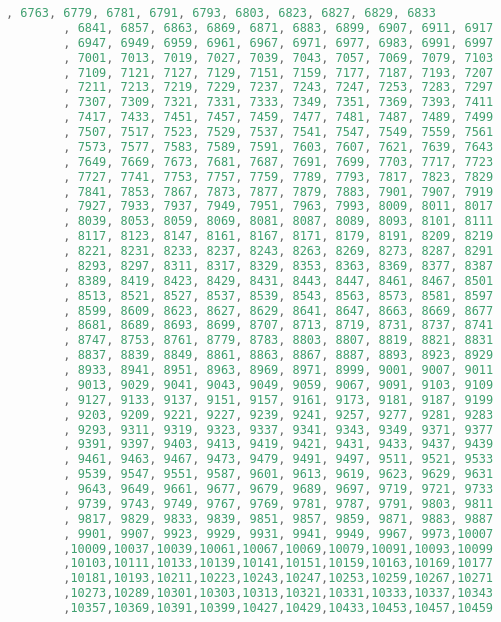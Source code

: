 \begin{solution}
\begin{lstlisting}[language=Java, caption="Java"]
		, 6763, 6779, 6781, 6791, 6793, 6803, 6823, 6827, 6829, 6833 
		, 6841, 6857, 6863, 6869, 6871, 6883, 6899, 6907, 6911, 6917 
		, 6947, 6949, 6959, 6961, 6967, 6971, 6977, 6983, 6991, 6997 
		, 7001, 7013, 7019, 7027, 7039, 7043, 7057, 7069, 7079, 7103 
		, 7109, 7121, 7127, 7129, 7151, 7159, 7177, 7187, 7193, 7207 
		, 7211, 7213, 7219, 7229, 7237, 7243, 7247, 7253, 7283, 7297 
		, 7307, 7309, 7321, 7331, 7333, 7349, 7351, 7369, 7393, 7411 
		, 7417, 7433, 7451, 7457, 7459, 7477, 7481, 7487, 7489, 7499 
		, 7507, 7517, 7523, 7529, 7537, 7541, 7547, 7549, 7559, 7561 
		, 7573, 7577, 7583, 7589, 7591, 7603, 7607, 7621, 7639, 7643 
		, 7649, 7669, 7673, 7681, 7687, 7691, 7699, 7703, 7717, 7723 
		, 7727, 7741, 7753, 7757, 7759, 7789, 7793, 7817, 7823, 7829 
		, 7841, 7853, 7867, 7873, 7877, 7879, 7883, 7901, 7907, 7919 
		, 7927, 7933, 7937, 7949, 7951, 7963, 7993, 8009, 8011, 8017 
		, 8039, 8053, 8059, 8069, 8081, 8087, 8089, 8093, 8101, 8111 
		, 8117, 8123, 8147, 8161, 8167, 8171, 8179, 8191, 8209, 8219 
		, 8221, 8231, 8233, 8237, 8243, 8263, 8269, 8273, 8287, 8291 
		, 8293, 8297, 8311, 8317, 8329, 8353, 8363, 8369, 8377, 8387 
		, 8389, 8419, 8423, 8429, 8431, 8443, 8447, 8461, 8467, 8501 
		, 8513, 8521, 8527, 8537, 8539, 8543, 8563, 8573, 8581, 8597 
		, 8599, 8609, 8623, 8627, 8629, 8641, 8647, 8663, 8669, 8677 
		, 8681, 8689, 8693, 8699, 8707, 8713, 8719, 8731, 8737, 8741 
		, 8747, 8753, 8761, 8779, 8783, 8803, 8807, 8819, 8821, 8831 
		, 8837, 8839, 8849, 8861, 8863, 8867, 8887, 8893, 8923, 8929 
		, 8933, 8941, 8951, 8963, 8969, 8971, 8999, 9001, 9007, 9011 
		, 9013, 9029, 9041, 9043, 9049, 9059, 9067, 9091, 9103, 9109 
		, 9127, 9133, 9137, 9151, 9157, 9161, 9173, 9181, 9187, 9199 
		, 9203, 9209, 9221, 9227, 9239, 9241, 9257, 9277, 9281, 9283 
		, 9293, 9311, 9319, 9323, 9337, 9341, 9343, 9349, 9371, 9377 
		, 9391, 9397, 9403, 9413, 9419, 9421, 9431, 9433, 9437, 9439 
		, 9461, 9463, 9467, 9473, 9479, 9491, 9497, 9511, 9521, 9533 
		, 9539, 9547, 9551, 9587, 9601, 9613, 9619, 9623, 9629, 9631 
		, 9643, 9649, 9661, 9677, 9679, 9689, 9697, 9719, 9721, 9733 
		, 9739, 9743, 9749, 9767, 9769, 9781, 9787, 9791, 9803, 9811 
		, 9817, 9829, 9833, 9839, 9851, 9857, 9859, 9871, 9883, 9887 
		, 9901, 9907, 9923, 9929, 9931, 9941, 9949, 9967, 9973,10007 
		,10009,10037,10039,10061,10067,10069,10079,10091,10093,10099 
		,10103,10111,10133,10139,10141,10151,10159,10163,10169,10177 
		,10181,10193,10211,10223,10243,10247,10253,10259,10267,10271 
		,10273,10289,10301,10303,10313,10321,10331,10333,10337,10343 
		,10357,10369,10391,10399,10427,10429,10433,10453,10457,10459 

\end{lstlisting}
\end{solution}
